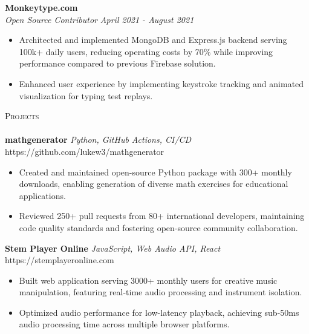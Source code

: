 \documentclass[letterpaper]{article}
\newcommand{\lineunder} {
    \vspace*{-8pt} \\
    \hspace*{-18pt} \hrulefill \\
}
\newcommand{\header} [1] {
    {\hspace*{-18pt}\vspace*{6pt} \textsc{#1}}
    \vspace*{-6pt} \lineunder
}
\begin{document}
    	\textbf{Monkeytype.com}\\
    
    \textit{Open Source Contributor} \hfill \textsl{April 2021 - August 2021}\\
    \vspace{-7pt}
    \begin{itemize} \itemsep -1mm
            \item Architected and implemented MongoDB and Express.js backend serving 100k+ daily users, reducing operating costs by 70\% while improving performance compared to previous Firebase solution.

            \item Enhanced user experience by implementing keystroke tracking and animated visualization for typing test replays.

    \end{itemize}
    \vspace{-2mm}

\header{Projects}

    {\textbf{mathgenerator}} {\sl Python, GitHub Actions, CI/CD} \hfill https://github.com/lukew3/mathgenerator\\
    \vspace{-2mm}
    \begin{itemize} \itemsep -1mm
    
        \item Created and maintained open-source Python package with 300+ monthly downloads, enabling generation of diverse math exercises for educational applications.

        \item Reviewed 250+ pull requests from 80+ international developers, maintaining code quality standards and fostering open-source community collaboration.

    \end{itemize}
    \vspace{-2mm}

    {\textbf{Stem Player Online}} {\sl JavaScript, Web Audio API, React} \hfill https://stemplayeronline.com\\
    \vspace{-2mm}
    \begin{itemize} \itemsep -1mm

        \item Built web application serving 3000+ monthly users for creative music manipulation, featuring real-time audio processing and instrument isolation.
        
        \item Optimized audio performance for low-latency playback, achieving sub-50ms audio processing time across multiple browser platforms.
        
    \end{itemize}
    \vspace{-2mm}
\end{document}
